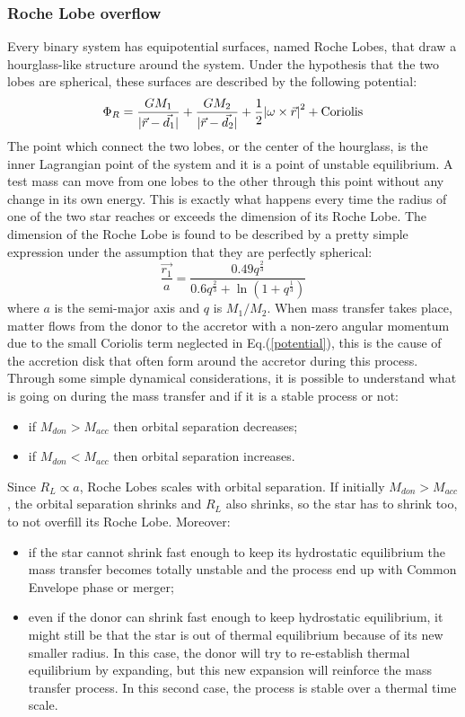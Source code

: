 \documentclass[prb,twocolumn,9pt]{revtex4-1}
\begin{document}
\subsubsection{Roche Lobe overflow} Every binary system has equipotential surfaces, named Roche Lobes, that draw a hourglass-like structure around the system. Under the hypothesis that the two lobes are spherical, these surfaces are described by the following potential:
\begin{equation}
   \Phi_R = \frac{GM_1}{|\Vec{r}-\vec{d_1}|}+\frac{GM_2}{|\Vec{r}-\vec{d_2}|}+\frac{1}{2}\abs{\omega \times \vec{r}}^2+\mbox{Coriolis}
    \label{potential}
\end{equation}
The point which connect the two lobes, or the center of the hourglass, is the inner Lagrangian point of the system and it is a point of unstable equilibrium. A test mass can move from one lobes to the other through this point without any change in its own energy. This is exactly what happens every time the radius of one of the two star reaches or exceeds the dimension of its Roche Lobe. The dimension of the Roche Lobe is found to be described by a pretty simple expression under the assumption that they are perfectly spherical:
\begin{equation}
\frac{\vec{r_1}}{a}=\frac{0.49q^{\frac{2}{3}}}{0.6q^{\frac{2}{3}}+\ln{(1+q^{\frac{1}{3}})}}
\end{equation}
where \(a\) is the semi-major axis and \(q\) is \(M_1/M_2\).
When mass transfer takes place, matter flows from the donor to the accretor with a non-zero angular momentum due to the small Coriolis term neglected in Eq.(\ref{potential}), this is the cause of the accretion disk that often form around the accretor during this process.
Through some simple dynamical considerations, it is possible to understand what is going on during the mass transfer and if it is a stable process or not:
\begin{itemize}
    \item if \(  M_{don} > M_{acc} \) then orbital separation decreases;
    \item if \(  M_{don} < M_{acc} \) then orbital separation increases.
\end{itemize}
Since \(R_L \propto a \), Roche Lobes scales with orbital separation.
If initially \(M_{don}>M_{acc}\), the orbital separation shrinks and \(R_L\) also shrinks, so the star has to shrink too, to not overfill its Roche Lobe.
Moreover:
\begin{itemize}
    \item if the star cannot shrink fast enough to keep its hydrostatic equilibrium the mass transfer becomes totally unstable and the process end up with Common Envelope phase or merger;
    \item even if the donor can shrink fast enough to keep hydrostatic equilibrium, it might still be that the star is out of thermal equilibrium because of its new smaller radius. In this case, the donor will try to re-establish thermal equilibrium by expanding, but this new expansion will reinforce the mass transfer process. In this second case, the process is stable over a thermal time scale.
\end{itemize}
 
\end{document}

